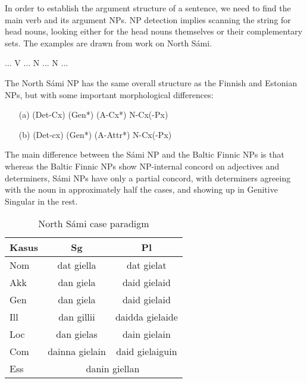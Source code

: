   \documentclass[a4paper,english]{article}
\begin{document}
In order to establish the argument structure of a sentence, we need to find the main verb and its argument NPs. NP detection implies scanning the string for head nouns, looking either for the head nouns themselves or their complementary sets. The examples are drawn from work on North Sámi.%

\begin{example}\label{islands}
... V ... N ... N ...
\end{example}

The North Sámi NP has the same overall structure as the Finnish and Estonian NPs, but with some important morphological differences:

\begin{example}\label{NP}
\begin{itemize}
\item[(a)] (Det-Cx) (Gen*) (A-Cx*) N-Cx(-Px)
\item[(b)] (Det-cx) (Gen*) (A-Attr*) N-Cx(-Px)
\end{itemize}
\end{example}

The main difference between the Sámi NP and the Baltic Finnic NPs is that whereas the Baltic Finnic NPs show NP-internal concord on adjectives and determiners, Sámi NPs have only a partial concord, with determiners agreeing with the noun in approximately half the cases, and showing up in Genitive Singular in the rest.%


\begin{table}[htdp]
\caption{North Sámi case paradigm}
\begin{center}
\begin{tabular}{|l|c|c|}
\hline
Kasus  & Sg       & Pl                        \\ \hline
Nom    & dat giella   & dat  gielat           \\ \hline
Akk    & dan giela    & daid  gielaid         \\ \hline
Gen    & dan giela    & daid  gielaid         \\ \hline
Ill    & dan gillii   & daidda  gielaide      \\ \hline
Loc    & dan gielas   & dain gielain          \\ \hline
Com    & dainna gielain & daid gielaiguin     \\ \hline
Ess & \multicolumn{2}{c|}{danin giellan}      \\ \hline
\end{tabular}
\end{center}
\label{smecas}
\end{table}%
\end{document}

